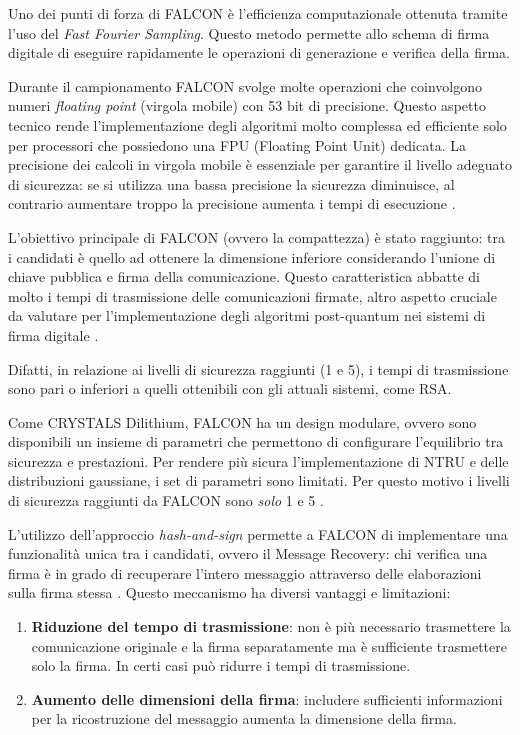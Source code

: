 Uno dei punti di forza di FALCON è l'efficienza computazionale ottenuta tramite l'uso del \textit{Fast Fourier Sampling}. Questo metodo permette allo schema di firma digitale di eseguire rapidamente le operazioni di generazione e verifica della firma.

Durante il campionamento FALCON svolge molte operazioni che coinvolgono numeri \textit{floating point} (virgola mobile) con 53 bit di precisione. Questo aspetto tecnico rende l'implementazione degli algoritmi molto complessa ed efficiente solo per processori che possiedono una FPU (Floating Point Unit) dedicata. La precisione dei calcoli in virgola mobile è essenziale per garantire il livello adeguato di sicurezza: se si utilizza una bassa precisione la sicurezza diminuisce, al contrario aumentare troppo la precisione aumenta i tempi di esecuzione \cite{falcon-submissionpackage-three}.

L'obiettivo principale di FALCON (ovvero la compattezza) è stato raggiunto: tra i candidati è quello ad ottenere la dimensione inferiore considerando l'unione di chiave pubblica e firma della comunicazione. Questo caratteristica abbatte di molto i tempi di trasmissione delle comunicazioni firmate, altro aspetto cruciale da valutare per l'implementazione degli algoritmi post-quantum nei sistemi di firma digitale \cite{NISTthirdReport}.

Difatti, in relazione ai livelli di sicurezza raggiunti (1 e 5), i tempi di trasmissione sono pari o inferiori a quelli ottenibili con gli attuali sistemi, come RSA.

Come CRYSTALS Dilithium, FALCON ha un design modulare, ovvero sono disponibili un insieme di parametri che permettono di configurare l'equilibrio tra sicurezza e prestazioni. Per rendere più sicura l'implementazione di NTRU e delle distribuzioni gaussiane, i set di parametri sono limitati. Per questo motivo i livelli di sicurezza raggiunti da FALCON sono \textit{solo} 1 e 5 \cite{falcon-submissionpackage-three}.

L'utilizzo dell'approccio \textit{hash-and-sign} permette a FALCON di implementare una funzionalità unica tra i candidati, ovvero il Message Recovery: chi verifica una firma è in grado di recuperare l'intero messaggio attraverso delle elaborazioni sulla firma stessa \cite{falcon-submissionpackage-three}. Questo meccanismo ha diversi vantaggi e limitazioni:
\begin{enumerate}
    \item \textbf{Riduzione del tempo di trasmissione}: non è più necessario trasmettere la comunicazione originale e la firma separatamente ma è sufficiente trasmettere solo la firma. In certi casi può ridurre i tempi di trasmissione.
    \item \textbf{Aumento delle dimensioni della firma}: includere sufficienti informazioni per la ricostruzione del messaggio aumenta la dimensione della firma.
\end{enumerate}

